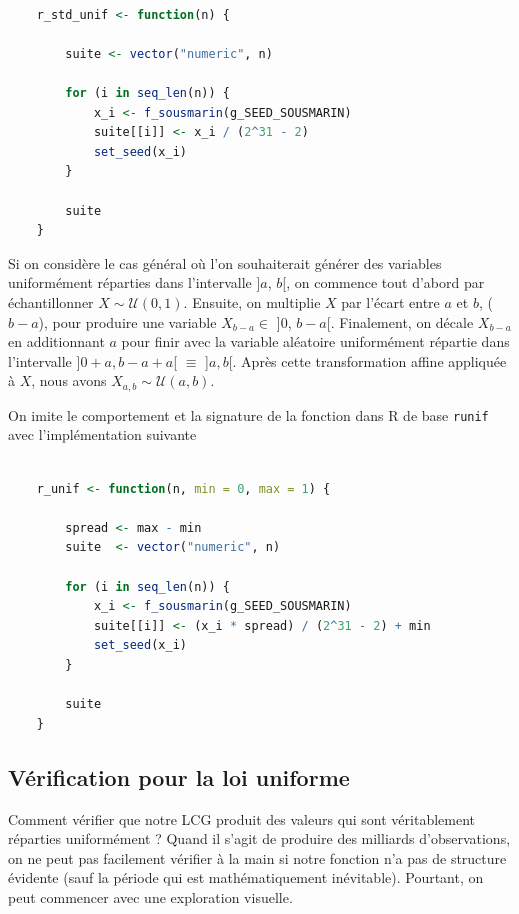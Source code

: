 \documentclass[10pt]{article} %
\begin{document}
\begin{lstlisting}[language=R]

    r_std_unif <- function(n) {

        suite <- vector("numeric", n)

        for (i in seq_len(n)) {
            x_i <- f_sousmarin(g_SEED_SOUSMARIN)
            suite[[i]] <- x_i / (2^31 - 2)
            set_seed(x_i)
        }

        suite
    }

\end{lstlisting}

Si on considère le cas général où l'on souhaiterait générer des variables uniformément réparties dans l'intervalle ]$a$, $b$[, on commence tout d'abord
par échantillonner $X \sim \mathcal{U}(0, 1)$. Ensuite, on multiplie $X$ par l'écart entre $a$ et $b$, ($b - a$), pour produire une variable $X_{b - a} \in$ ]$0$, $b - a$[. Finalement,
on décale $X_{b - a}$ en additionnant $a$ pour finir avec la variable aléatoire uniformément répartie dans l'intervalle ]$0 + a, b - a + a$[ $\equiv $ ]$a, b$[. Après cette transformation affine appliquée à
$X$, nous avons $X_{a,b} \sim \mathcal{U}(a, b)$.

On imite le comportement et la signature de la fonction dans R de base \texttt{runif} avec l'implémentation suivante

\begin{lstlisting}[language=R]

    r_unif <- function(n, min = 0, max = 1) {

        spread <- max - min
        suite  <- vector("numeric", n)

        for (i in seq_len(n)) {
            x_i <- f_sousmarin(g_SEED_SOUSMARIN)
            suite[[i]] <- (x_i * spread) / (2^31 - 2) + min
            set_seed(x_i)
        }

        suite
    }

\end{lstlisting}


\subsection{Vérification pour la loi uniforme}

Comment vérifier que notre LCG produit des valeurs qui sont véritablement réparties uniformément ? Quand il s'agit de produire
des milliards d'observations, on ne peut pas facilement vérifier à la main si notre fonction n'a pas de structure évidente (sauf la période qui est mathématiquement inévitable).
Pourtant, on peut commencer avec une exploration visuelle.
\end{document}
